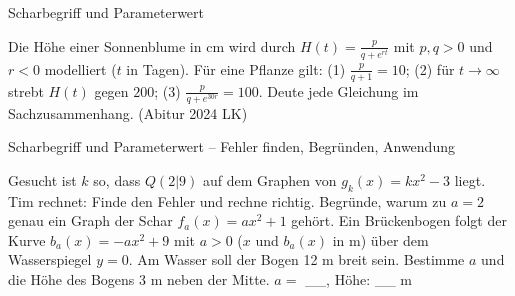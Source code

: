 \begin{aufgabe}{Scharbegriff und Parameterwert}
\begin{teile}
\begin{ksys}[xmin=-3,xmax=3,ymin=-2,ymax=8,ablesen]  \end{ksys}
\teil Die Höhe einer Sonnenblume in cm wird durch $H(t) = \frac{p}{q + e^{r t}}$ mit $p, q > 0$ und $r < 0$ modelliert ($t$ in Tagen). Für eine Pflanze gilt: (1) $\frac{p}{q + 1} = 10$; (2) für $t \to \infty$ strebt $H(t)$ gegen $200$; (3) $\frac{p}{q + e^{30r}} = 100$. Deute jede Gleichung im Sachzusammenhang. \hfill (Abitur 2024 LK)
\end{teile}
\end{aufgabe}

\begin{aufgabe}{Scharbegriff und Parameterwert – Fehler finden, Begründen, Anwendung}
\begin{teile}
\teil Gesucht ist $k$ so, dass $Q(2 | 9)$ auf dem Graphen von $g_k(x) = k x^2 - 3$ liegt. Tim rechnet:  Finde den Fehler und rechne richtig.
\teil Begründe, warum zu $a = 2$ genau ein Graph der Schar $f_a(x) = a x^2 + 1$ gehört.
\teil Ein Brückenbogen folgt der Kurve $b_a(x) = -a x^2 + 9$ mit $a > 0$ ($x$ und $b_a(x)$ in m) über dem Wasserspiegel $y = 0$. Am Wasser soll der Bogen 12 m breit sein. Bestimme $a$ und die Höhe des Bogens 3 m neben der Mitte. $a =$ \_\_, Höhe: \_\_ m
\end{teile}
\end{aufgabe}
